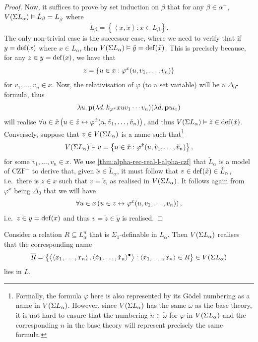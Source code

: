 \documentclass[12pt,openany]{book}
\theoremstyle{plain}
\theoremstyle{definition}
\newcommand\tuple[1]{\left\langle #1 \right\rangle}
\newcommand\opA[1]{\mathop{\forall #1}}
\newcommand\oplam[1]{\mathop{\lambda #1.}}
\DeclareMathOperator\dd{def}
\newcommand\CZF{\mathrm{CZF}}
\newcommand\bp{\mathbf{p}}
\newcommand\ior{\iota_\textup{r}}
\begin{document}
\begin{proof}
  Now, it suffices to prove by set induction on $\beta$ that for any $\beta \in \alpha^+$, $V\mleft(\Sigma L_\alpha\mright) \vDash \check{L}_\beta = L_{\check{\beta}}$ where
  \[\check{L}_\beta = \left\{\tuple{x, \check{x}} : x \in L_\beta\right\}.\]
  The only non-trivial case is the successor case, where we need to verify that if $y = \dd\mleft(x\mright)$ where $x \in L_\alpha$, then $V\mleft(\Sigma L_\alpha\mright) \vDash \check{y} = \dd\mleft(\check{x}\mright)$. This is precisely because, for any $z \in y = \dd\mleft(x\mright)$, we have that
  \[z = \left\{u \in x : \varphi^x\mleft(u, v_1, \ldots, v_n\mright)\right\}\]
  for $v_1, \ldots, v_n \in x$. Now, the relativisation of $\varphi$ (to a set variable) will be a $\Delta_0$-formula, thus
  \[\oplam{u} \bp \mleft(\oplam{d} k_{\varphi^x} xu v_1 \cdots v_n\mright) \mleft(\oplam{d} \bp u \ior\mright)\]
  will realise $\opA{u \in \check{x}} \left(u \in \check{z} \leftrightarrow \varphi^{\check{x}}\mleft(u, \check{v}_1, \ldots, \check{v}_n\mright)\right)$, and thus $V\mleft(\Sigma L_\alpha\mright) \vDash \check{z} \in \dd\mleft(\check{x}\mright)$. Conversely, suppose that $v \in V\mleft(\Sigma L_\alpha\mright)$ is a name such that\footnote{Formally, the formula $\varphi$ here is also represented by its G\"odel numbering as a name in $V\mleft(\Sigma L_\alpha\mright)$. However, since $V\mleft(\Sigma L_\alpha\mright)$ has the same $\omega$ as the base theory, it is not hard to ensure that the numbering $\check{n} \in \check{\omega}$ for $\varphi$ in $V\mleft(\Sigma L_\alpha\mright)$ and the corresponding $n$ in the base theory will represent precisely the same formula.}
  \[V\mleft(\Sigma L_\alpha\mright) \vDash v = \left\{u \in \check{x} : \varphi^{\check{x}}\mleft(u, \check{v}_1, \ldots, \check{v}_n\mright)\right\},\]
  for some $v_1, \ldots, v_n \in x$. We use \autoref{thm:alpha-rec-real-l-alpha-czf} that $\check{L}_\alpha$ is a model of $\CZF^-$ to derive that, given $\check{x} \in \check{L}_\alpha$, it must follow that $v \in \dd\mleft(\check{x}\mright) \in \check{L}_\alpha$, i.e.\ there is $z \in x$ such that $v = \check{z}$, as realised in $V\mleft(\Sigma L_\alpha\mright)$. It follows again from $\varphi^x$ being $\Delta_0$ that we will have
  \[\opA{u \in x} \left(u \in z \leftrightarrow \varphi^x\mleft(u, v_1, \ldots, v_n\mright)\right),\]
  i.e.\ $z \in y = \dd\mleft(x\mright)$ and thus $v = \check{z} \in \check{y}$ is realised.
\end{proof}

\begin{corollary}
  \label{cor:alpha-rec-real-sigma1-rel-correctness}
  Consider a relation $R \subseteq L_\alpha^n$ that is $\Sigma_1$-definable in $L_\alpha$. Then $V\mleft(\Sigma L_\alpha\mright)$ realises that the corresponding name
  \[\overline{R} = \left\{\tuple{\tuple{x_1, \ldots, x_n}, \tuple{\check{x}_1, \ldots, \check{x}_n}^\bullet} : \tuple{x_1, \ldots, x_n} \in R\right\} \in V\mleft(\Sigma L_\alpha\mright)\]
  lies in $L$.
\end{corollary}
\end{document}
